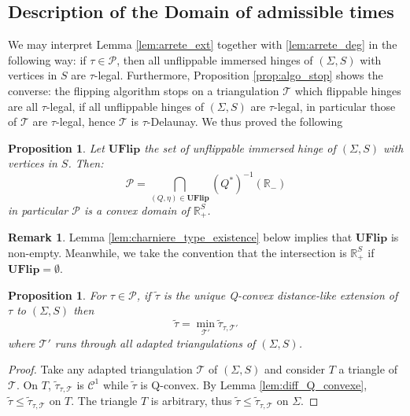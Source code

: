 \documentclass[a4paper,12pt]{article}
\def\TT{\mathcal T}
\def\adm{\P}
\def\RR{\mathbb{R}}
\def\adm{\mathcal{P}}
\def\P{\mathcal{P}}
\newcommand{\tautilde}[2]{\widetilde\tau_{#1,#2}}
\newtheorem{prop}[lem]{Proposition}
\theoremstyle{definition}
\newtheorem*{rem}{Remark}			 %
\begin{document}
						
						

				
					\subsection{Description of the Domain of admissible times}


						We may interpret Lemma \ref{lem:arrete_ext} together with \ref{lem:arrete_deg} in the following way: if $\tau \in \adm$, then all unflippable immersed hinges of $(\Sigma, S)$ with vertices in $S$ are $\tau$-legal. Furthermore, Proposition \ref{prop:algo_stop} shows the converse: the flipping algorithm stops on a triangulation $\TT$ which flippable hinges are all $\tau$-legal, if all unflippable hinges of $(\Sigma, S)$ are $\tau$-legal, in particular those of $\TT$ are $\tau$-legal, hence $\TT$ is $\tau$-Delaunay.
						We thus proved the following


						\begin{prop}\label{prop:domaine_convexe}
						Let $\mathbf{UFlip}$ the set of unflippable immersed hinge of $(\Sigma, S)$ with vertices in $S$. Then:
						 $$\adm = \bigcap_{(Q,\eta)\in \mathbf{UFlip}} (Q^*)^{-1}(\RR_-)$$
						 in particular $\adm$ is a convex domain of $\RR_+^{S}$.
						\end{prop}
						\begin{rem}
						 Lemma \ref{lem:charniere_type_existence} below implies that $\mathbf{UFlip}$ is non-empty. Meanwhile, we take the convention that the intersection is $\RR_+^S$ if $\mathbf{UFlip} =\emptyset$.
						\end{rem}

						\begin{prop}
						 For $\tau\in \adm$, if $\widetilde\tau$ is the unique Q-convex distance-like extension of $\tau$ to $(\Sigma, S)$ then
						 $$\widetilde\tau = \min_{\TT'} \tautilde{\tau}{\TT'} $$
						 where $\TT'$ runs through all adapted triangulations of $(\Sigma, S)$.
						\end{prop}
						\begin{proof}
						 Take any adapted triangulation $\TT$ of $(\Sigma, S)$ and consider $T$ a triangle of $\TT$. On $T$, $\tautilde{\tau}{\TT}$ is $\mathscr C^1$ while $\widetilde\tau$ is Q-convex. By Lemma \ref{lem:diff_Q_convexe}, $\widetilde\tau \leq \tautilde{\tau}{\TT}$ on $T$. 
						 The triangle $T$ is arbitrary, thus $\widetilde\tau \leq \tautilde{\tau}{\TT}$ on $\Sigma$. 
						\end{proof}
\end{document}
